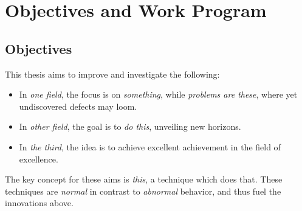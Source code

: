 
\chapter{Objectives and Work Program}

\section{Objectives}
\label{sec-objectives}

This thesis aims to improve and investigate the following:

\begin{itemize}
	\item In \emph{one field}, the focus is on \emph{something}, while \emph{problems are these}, where yet undiscovered defects may loom.
	\item In \emph{other field}, the goal is to \emph{do this}, unveiling new horizons.
	\item In \emph{the third}, the idea is to achieve excellent achievement in the field of excellence.
\end{itemize}

\noindent The key concept for these aims is \emph{this}, a  technique which does that.  These techniques are \emph{normal} in contrast to \emph{abnormal} behavior, and thus fuel the innovations above.

%
%


